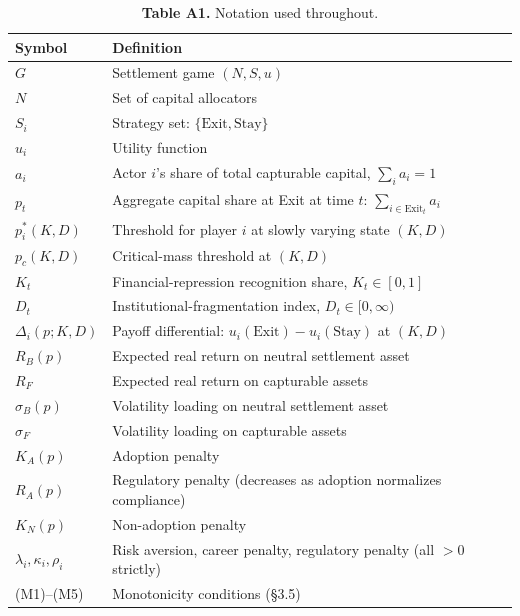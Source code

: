 \documentclass[12pt]{article}
\theoremstyle{definition}
\theoremstyle{remark}
\begin{document}
\begin{table}[h]
\centering
\caption*{\textbf{Table A1.} Notation used throughout.}
\begin{tabularx}{\textwidth}{lX}
\toprule
Symbol & Definition \\
\midrule
$G$ & Settlement game $(N, S, u)$ \\
$N$ & Set of capital allocators \\
$S_i$ & Strategy set: $\{\text{Exit}, \text{Stay}\}$ \\
$u_i$ & Utility function \\
$a_i$ & Actor $i$'s share of total capturable capital, $\sum_i a_i = 1$ \\
$p_t$ & Aggregate capital share at Exit at time $t$: $\sum_{i \in \text{Exit}_t} a_i$ \\
$p_i^*(K, D)$ & Threshold for player $i$ at slowly varying state $(K, D)$ \\
$p_c(K, D)$ & Critical-mass threshold at $(K, D)$ \\
$K_t$ & Financial-repression recognition share, $K_t \in [0, 1]$ \\
$D_t$ & Institutional-fragmentation index, $D_t \in [0, \infty)$ \\
$\Delta_i(p; K, D)$ & Payoff differential: $u_i(\text{Exit}) - u_i(\text{Stay})$ at $(K, D)$ \\
$R_B(p)$ & Expected real return on neutral settlement asset \\
$R_F$ & Expected real return on capturable assets \\
$\sigma_B(p)$ & Volatility loading on neutral settlement asset \\
$\sigma_F$ & Volatility loading on capturable assets \\
$K_A(p)$ & Adoption penalty \\
$R_A(p)$ & Regulatory penalty (decreases as adoption normalizes compliance) \\
$K_N(p)$ & Non-adoption penalty \\
$\lambda_i, \kappa_i, \rho_i$ & Risk aversion, career penalty, regulatory penalty (all $> 0$ strictly) \\
(M1)--(M5) & Monotonicity conditions (\S3.5) \\
\bottomrule
\end{tabularx}
\end{table}

\end{document}
